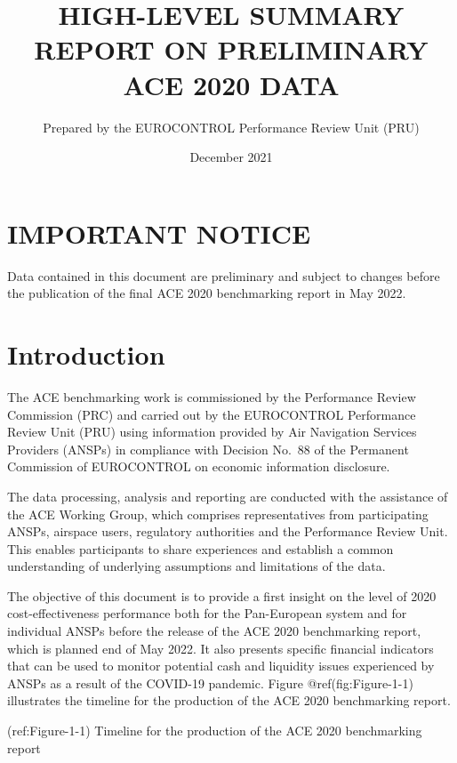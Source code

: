 \documentclass[
]{book}
\title{HIGH-LEVEL SUMMARY REPORT ON PRELIMINARY ACE 2020 DATA}
\author{Prepared by the EUROCONTROL Performance Review Unit (PRU)}
\date{December 2021}
\begin{document}
\frontmatter
\maketitle

\mainmatter
\hypertarget{important-notice}{%
\chapter*{IMPORTANT NOTICE}\label{important-notice}}

{Data contained in this document are preliminary and subject to changes
before the publication of the final ACE 2020 benchmarking report in May
2022.}

\hypertarget{Intro}{%
\chapter{Introduction}\label{Intro}}

The ACE benchmarking work is commissioned by the Performance Review
Commission (PRC) and carried out by the EUROCONTROL Performance Review
Unit (PRU) using information provided by Air Navigation Services
Providers (ANSPs) in compliance with Decision No.~88 of the Permanent
Commission of EUROCONTROL on economic information disclosure.

The data processing, analysis and reporting are conducted with the
assistance of the ACE Working Group, which comprises representatives
from participating ANSPs, airspace users, regulatory authorities and the
Performance Review Unit. This enables participants to share experiences
and establish a common understanding of underlying assumptions and
limitations of the data.

The objective of this document is to provide a first insight on the
level of 2020 cost-effectiveness performance both for the Pan-European
system and for individual ANSPs before the release of the ACE 2020
benchmarking report, which is planned end of May 2022. It also presents
specific financial indicators that can be used to monitor potential cash
and liquidity issues experienced by ANSPs as a result of the COVID-19
pandemic. Figure @ref(fig:Figure-1-1) illustrates the timeline for the
production of the ACE 2020 benchmarking report.

(ref:Figure-1-1) Timeline for the production of the ACE 2020
benchmarking report
\end{document}

